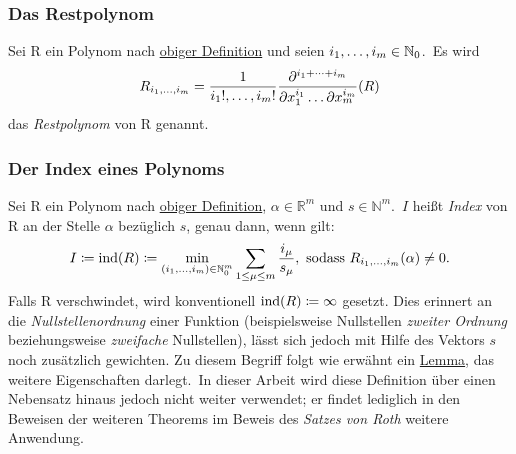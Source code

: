     \subsubsection{Das Restpolynom}
        \label{subsubsec:def-remainder-poly}
        Sei R ein Polynom nach \hyperref[subsubsec:def-poly]{obiger Definition} und seien $i_1, \dots, i_m \in
        \mathbb{N}_0$.\ Es wird
        \begin{equation}
            R_{i_1, \dots, i_m} = \frac{1}{i_1!, \dots, i_m!} \frac{\partial^{i_1 + \dots + i_m}}{
                \partial x_1^{i_1} \dots \partial x_m^{i_m}} (R) \label{eq:def-rempoly}
        \end{equation}
        das \emph{Restpolynom} von R genannt.
    
    \subsubsection{Der Index eines Polynoms}
        \label{subsubsec:def-index}
        \textrm{Sei R ein Polynom nach \hyperref[subsubsec:def-poly]{obiger Definition}, $\alpha \in \mathbb{R}^m$
            und $s \in \mathbb{N}^m$.\ $I$ heißt \emph{Index} von R an der Stelle $\alpha$ bezüglich $s$, genau dann,
            wenn gilt:}
        \begin{equation}
            I \coloneq \operatorname{ind}(R) \coloneq \min_{(i_1, \dots, i_m) \in \mathbb{N}_0^m} \sum_{1 \leq \mu \leq m} \frac{i_\mu}
            {s_\mu}, \ \textrm{sodass}\  R_{i_1, \dots, i_m}(\alpha) \neq 0. \label{eq:def-index}
        \end{equation}
        Falls R verschwindet, wird konventionell $\operatorname{ind}(R) \coloneq \infty$ gesetzt.
        \newline
        \textrm{Dies erinnert an die \emph{Nullstellenordnung} einer Funktion (beispielsweise Nullstellen
        \emph{zweiter Ordnung} beziehungsweise \emph{zweifache} Nullstellen), lässt sich jedoch mit Hilfe des
        Vektors $s$ noch zusätzlich gewichten.
        \newline
        Zu diesem Begriff folgt wie erwähnt ein \hyperref[subsec:lemma2]{Lemma}, das weitere Eigenschaften
        darlegt.\ In dieser Arbeit wird diese Definition über einen Nebensatz hinaus jedoch nicht weiter verwendet; er
        findet lediglich in den Beweisen der weiteren Theorems im Beweis des \emph{Satzes von Roth} weitere Anwendung.}
    
